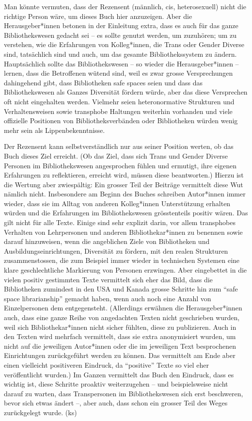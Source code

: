\documentclass[a4paper,
fontsize=11pt,
oneside,
numbers=noperiodatend,
parskip=half-,
bibliography=totoc,
final
]{scrartcl}
\begin{document}
Man könnte vermuten, dass der Rezensent (männlich, cis, heterosexuell)
nicht die richtige Person wäre, um dieses Buch hier anzuzeigen. Aber die
Herausgeber*innen betonen in der Einleitung extra, dass es auch für das
ganze Bibliothekswesen gedacht sei -- es sollte genutzt werden, um
zuzuhören; um zu verstehen, wie die Erfahrungen von Kolleg*innen, die
Trans oder Gender Diverse sind, tatsächlich sind und auch, um das
gesamte Bibliothekssystem zu ändern. Hauptsächlich sollte das
Bibliothekswesen -- so wieder die Herausgeber*innen -- lernen, dass die
Betroffenen wütend sind, weil es zwar grosse Versprechungen dahingehend
gibt, dass Bibliotheken safe spaces seien und dass das Bibliothekswesen
als Ganzes Diversität fördern würde, aber das diese Versprechen oft
nicht eingehalten werden. Vielmehr seien heteronormative Strukturen und
Verhaltensweisen sowie transphobe Haltungen weiterhin vorhanden und
viele offizielle Positionen von Bibliotheksverbänden oder Bibliotheken
würden wenig mehr sein als Lippenbekenntnisse.

Der Rezensent kann selbstverständlich nur aus seiner Position werten, ob
das Buch dieses Ziel erreicht. (Ob das Ziel, dass sich Trans und Gender
Diverse Personen im Bibliothekswesen angesprochen fühlen und ermutigt,
ihre eigenen Erfahrungen zu reflektieren, erreicht wird, müssen diese
beantworten.) Hierzu ist die Wertung aber zwiespältig: Ein grosser Teil
der Beiträge vermittelt diese Wut nämlich nicht. Insbesondere am Beginn
des Buches schreiben Autor*innen immer wieder, dass sie im Alltag von
anderen Kolleg*innen Unterstützung erhalten würden und die Erfahrungen
im Bibliothekswesen grösstenteils positiv wären. Das gilt nicht für alle
Texte. Einige sind sehr explizit darin, vor allem transphobes Verhalten
von Lehrpersonen und anderen Bibliothekar*innen zu benennen sowie darauf
hinzuweisen, wenn die angeblichen Ziele von Bibliotheken und
Ausbildungseinrichtungen, Diversität zu fördern, mit den realen
Strukturen zusammenstossen, die zum Beispiel immer wieder in technischen
Systemen eine klare geschlechtliche Markierung von Personen erzwingen.
Aber eingebettet in die vielen positiv gestimmten Texte vermittelt sich
eher das Bild, dass die Bibliotheken zumindest in den USA und Kanada
grosse Schritte hin zum ``safe space librarianship'' gemacht haben, wenn
auch noch eine Anzahl von Einzelpersonen dem entgegensteht. (Allerdings
erwähnen die Herausgeber*innen auch, dass eine ganze Reihe von
angedachten Texten nicht geschrieben wurden, weil sich
Bibliothekar*innen nicht sicher fühlten, diese zu publizieren. Auch in
den Texten wird mehrfach vermittelt, dass sie extra anonymisiert wurden,
um nicht auf die jeweiligen Autor*innen oder die im jeweiligen Text
besprochenen Einrichtungen zurückgeführt werden zu können. Das
vermittelt am Ende aber einen vielleicht positiveren Eindruck, da
``positive'' Texte so viel eher veröffentlicht wurden.) Im Ganzen
vermittelt das Buch den Eindruck, dass es wichtig ist, diese Schritte
proaktiv weiterzugehen -- und beispielsweise nicht darauf zu warten,
dass Transpersonen im Bibliothekswesen sich erst beschweren, bevor sich
etwas ändert --, aber auch, dass schon ein grosser Teil des Weges
zurückgelegt wurde. (ks)
\end{document}
